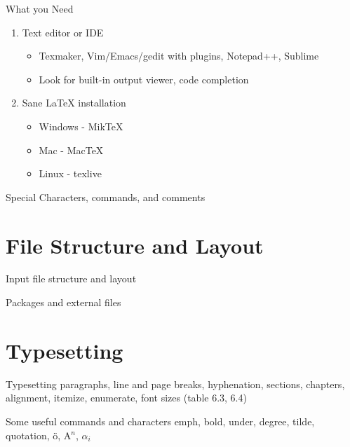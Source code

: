 \documentclass[11pt]{beamer}
\begin{document}
%
%
\begin{frame}{What you Need}
\begin{enumerate}
	\item Text editor or IDE
	\begin{itemize}
		\item Texmaker, Vim/Emacs/gedit with plugins, Notepad++, Sublime
		\item Look for built-in output viewer, code completion
	\end{itemize}
	\item Sane \LaTeX{} installation
	\begin{itemize}
		\item Windows - MikTeX
		\item Mac - MacTeX
		\item Linux - texlive
	\end{itemize}
\end{enumerate}
\end{frame}

%
%
\begin{frame}{Special Characters, commands, and comments}

\end{frame}

%
%
\section{File Structure and Layout}
\begin{frame}{Input file structure and layout}

\end{frame}

%
%
\begin{frame}{Packages and external files}

\end{frame}

%
%
\section{Typesetting}
\begin{frame}{Typesetting}
paragraphs, line and page breaks, hyphenation, sections, chapters, alignment, itemize, enumerate, font sizes (table 6.3, 6.4)
\end{frame}

%
%
\begin{frame}{Some useful commands and characters}
emph, bold, under, degree, tilde, quotation, \"{o}, A$^{n}$, $\alpha_i$
\end{frame}
\end{document}
